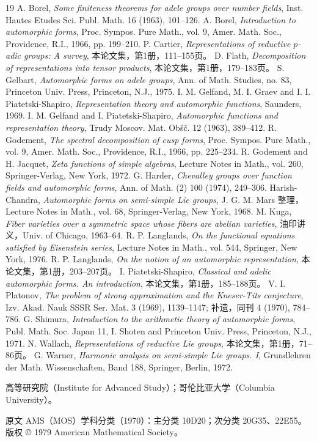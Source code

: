 \begin{thebibliography}{19}
 A. Borel, \emph{Some finiteness theorems for adele groups over number fields}, Inst. Hautes Etudes Sci. Publ. Math. 16 (1963), 101--126.
 A. Borel, \emph{Introduction to automorphic forms}, Proc. Sympos. Pure Math., vol. 9, Amer. Math. Soc., Providence, R.I., 1966, pp. 199--210.
 P. Cartier, \emph{Representations of reductive $p$-adic groups: A survey}, 本论文集，第1册，111--155页。
 D. Flath, \emph{Decomposition of representations into tensor products}, 本论文集，第1册，179--183页。
 S. Gelbart, \emph{Automorphic forms on adele groups}, Ann. of Math. Studies, no. 83, Princeton Univ. Press, Princeton, N.J., 1975.
 I. M. Gelfand, M. I. Graev and I. I. Piatetski-Shapiro, \emph{Representation theory and automorphic functions}, Saunders, 1969.
 I. M. Gelfand and I. Piatetski-Shapiro, \emph{Automorphic functions and representation theory}, Trudy Moscov. Mat. Obšč. 12 (1963), 389--412.
 R. Godement, \emph{The spectral decomposition of cusp forms}, Proc. Sympos. Pure Math., vol. 9, Amer. Math. Soc., Providence, R.I., 1966, pp. 225--234.
 R. Godement and H. Jacquet, \emph{Zeta functions of simple algebras}, Lecture Notes in Math., vol. 260, Springer-Verlag, New York, 1972.
 G. Harder, \emph{Chevalley groups over function fields and automorphic forms}, Ann. of Math. (2) 100 (1974), 249--306.
 Harish-Chandra, \emph{Automorphic forms on semi-simple Lie groups}, J. G. M. Mars 整理，Lecture Notes in Math., vol. 68, Springer-Verlag, New York, 1968.
 M. Kuga, \emph{Fiber varieties over a symmetric space whose fibers are abelian varieties}, 油印讲义，Univ. of Chicago, 1963--64.
 R. P. Langlands, \emph{On the functional equations satisfied by Eisenstein series}, Lecture Notes in Math., vol. 544, Springer, New York, 1976.
 R. P. Langlands, \emph{On the notion of an automorphic representation}, 本论文集，第1册，203--207页。
 I. Piatetski-Shapiro, \emph{Classical and adelic automorphic forms. An introduction}, 本论文集，第1册，185--188页。
 V. I. Platonov, \emph{The problem of strong approximation and the Kneser-Tits conjecture}, Izv. Akad. Nauk SSSR Ser. Mat. 3 (1969), 1139--1147; 补遗，同刊 4 (1970), 784--786.
 G. Shimura, \emph{Introduction to the arithmetic theory of automorphic forms}, Publ. Math. Soc. Japan 11, I. Shoten and Princeton Univ. Press, Princeton, N.J., 1971.
 N. Wallach, \emph{Representations of reductive Lie groups}, 本论文集，第1册，71--86页。
 G. Warner, \emph{Harmonic analysis on semi-simple Lie groups. I}, Grundlehren der Math. Wissenschaften, Band 188, Springer, Berlin, 1972.
\end{thebibliography}
\noindent 高等研究院（Institute for Advanced Study）；哥伦比亚大学（Columbia University）。
\par\noindent\footnotesize 原文 AMS（MOS）学科分类（1970）：主分类 10D20；次分类 20G35、22E55。版权 © 1979 American Mathematical Society。\normalsize
